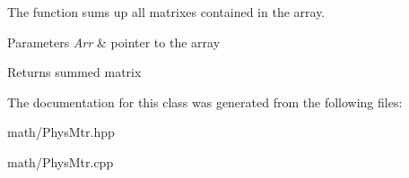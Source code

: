 The function sums up all matrixes contained in the array. 


\begin{DoxyParams}{Parameters}
{\em Arr} & pointer to the array \\
\hline
\end{DoxyParams}
\begin{DoxyReturn}{Returns}
summed matrix 
\end{DoxyReturn}


The documentation for this class was generated from the following files\+:\begin{DoxyCompactItemize}
\item 
math/Phys\+Mtr.\+hpp\item 
math/Phys\+Mtr.\+cpp\end{DoxyCompactItemize}
